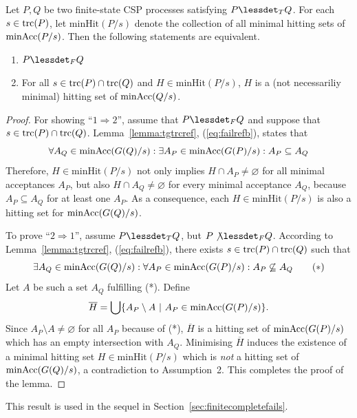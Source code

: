 \begin{lemma}
\label{lemma:hseta}
Let $P, Q$ be two finite-state CSP processes satisfying $P\lessdet_T Q$.
For each $s\in\text{trc}(P)$,
let $\text{minHit}(P/s)$ denote the
collection of all minimal hitting sets of $\text{minAcc}(P/s)$.
Then the following statements are equivalent.
\begin{enumerate}
\item $P\lessdet_F Q$ 
\item For all $s\in\text{trc}(P)\cap \text{trc}(Q)$ and $H \in  \text{minHit}(P/s)$, $H$ is
a (not necessariliy minimal) hitting set of $\text{minAcc}(Q/s)$.
\end{enumerate}
\end{lemma}
\begin{proof}
For showing ``$1 \Rightarrow 2$'', assume that $P\lessdet_F Q$ and suppose
that $s\in\text{trc}(P)\cap \text{trc}(Q)$. Lemma~\ref{lemma:tgtrcref},
(\ref{eq:failrefb}), states that
\[
\forall A_Q\in\text{minAcc}(G(Q)/s):
\exists A_P\in\text{minAcc}(G(P)/s): A_P\subseteq A_Q
\]
Therefore, $H \in  \text{minHit}(P/s)$ not only implies $H\cap
A_P\neq\varnothing$ for all minimal acceptances $A_P$, but also $H\cap
A_Q\neq\varnothing$ for every minimal acceptance $A_Q$, because $A_P\subseteq
A_Q$ for at least one $A_P$. As a consequence, each $H \in
\text{minHit}(P/s)$ is also a hitting set for $\text{minAcc}(G(Q)/s)$.

To prove ``$2 \Rightarrow 1$'', assume $P\lessdet_T Q$, but $P\not\lessdet_F
Q$. According to Lemma~\ref{lemma:tgtrcref}, (\ref{eq:failrefb}), there
exists $s\in\text{trc}(P)\cap \text{trc}(Q)$ such that
\[
\exists A_Q\in\text{minAcc}(G(Q)/s): \forall A_P\in\text{minAcc}(G(P)/s): A_P\not\subseteq A_Q
\qquad (*)
\]
Let $A$ be such a set $A_Q$ fulfilling (*).
Define
\[
\overline H = \bigcup\{ A_P \setminus A~|~A_P\in\text{minAcc}(G(P)/s) \}.
\]
Since $A_P \setminus A \neq\varnothing$ for all $A_P$ because of (*),
$\overline H$ is a hitting set of $\text{minAcc}(G(P)/s)$ which has an  empty
intersection with $A_Q$. 
Minimising $\overline H$ induces the existence of a minimal hitting set $H\in
\text{minHit}(P/s)$ which is {\it not} a hitting set of $\text{minAcc}(G(Q)/s)$, a
contradiction to Assumption~2. This completes the proof of the lemma. \xbox
\end{proof}
%
This result is used in the sequel in Section~\ref{sec:finitecompletefails}.

%
%
